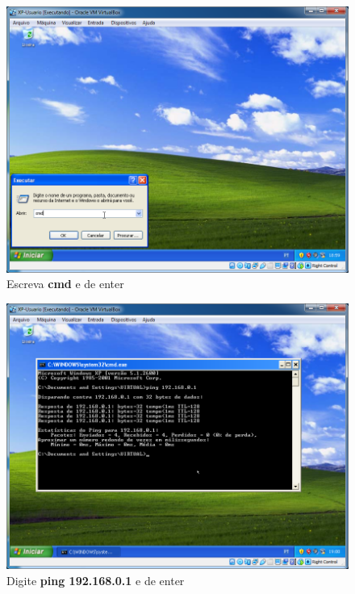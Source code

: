 \documentclass[10pt]{article}
\begin{document}
\begin{figure}[H]
    \centering
    \caption{Escreva \textbf{cmd} e de enter}
    \label{fig:443002}
    \includegraphics[width=\linewidth]{images/xp_rede/testando_comunicação_entre_os_windows/002.png}
\end{figure}
\begin{figure}[H]
    \centering
    \caption{Digite \textbf{ping 192.168.0.1} e de enter}
    \label{fig:443004}
    \includegraphics[width=\linewidth]{images/xp_rede/testando_comunicação_entre_os_windows/004.png}
\end{figure}
\end{document}
